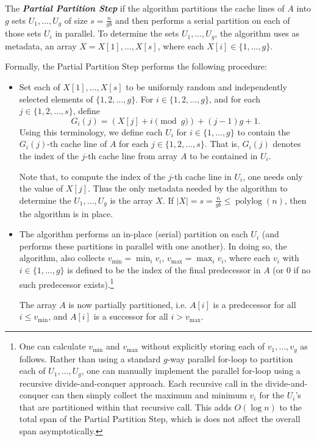 \documentclass[11pt]{article}
\newcommand{\defn}[1]{{\textit{\textbf{\boldmath #1}}} }
\theoremstyle{remark}
\theoremstyle{remark}
\begin{document}
The \defn{Partial Partition Step} if the algorithm partitions the
cache lines of $A$ into $g$ sets $U_1, \ldots, U_{g}$ of size $s =
\frac{n}{gb}$ and then performs a serial partition on each of those sets
$U_i$ in parallel. To determine the sets $U_1, \ldots, U_{g}$, the
algorithm uses as metadata, an array $X = X[1], \ldots, X[s]$,
where each $X[i] \in \{1, \ldots, g\}$.

Formally, the Partial Partition Step performs the following procedure:
\begin{itemize}
\item Set each of $X[1], \ldots, X[s]$ to be uniformly random and
  independently selected elements of $\{1, 2, \ldots, g\}$. For
  $i \in \{1, 2, \ldots, g\}$, and for each $j \in \{1, 2,
  \ldots, s\}$, define
  $$G_i(j) = (X[j] + i \pmod g) + (j - 1)g + 1.$$ Using this
  terminology, we define each $U_i$ for $i \in \{1, \ldots, g\}$ to
  contain the $G_i(j)$-th cache line of $A$ for each $j \in \{1, 2,
  \ldots, s\}$. That is, $G_i(j)$ denotes the index of the $j$-th
  cache line from array $A$ to be contained in $U_i$.

  Note that, to compute the index of the $j$-th cache line in $U_i$,
  one needs only the value of $X[j]$. Thus the only metadata needed by
  the algorithm to determine the $U_1, \ldots, U_g$ is the array
  $X$. If $|X| = s = \frac{n}{gb} \le \operatorname{polylog}(n)$, then
  the algorithm is in place.
  
\item The algorithm performs an in-place (serial) partition on each
  $U_i$ (and performs these partitions in parallel with one
  another). In doing so, the algorithm, also collects
  $v_{\text{min}}=\min_i{v_i}$, $v_{\text{max}}=\max_i{v_i}$, where
	each $v_i$ with $i \in \{1, \ldots, g\}$ is defined to be the index
  of the final predecessor in $A$ (or $0$ if no such predecessor
  exists).\footnote{One can calculate $v_{\text{min}}$ and
    $v_{\text{max}}$ without explicitly storing each of $v_1, \ldots,
		v_{g}$ as follows. Rather than using a standard $g$-way parallel
		for-loop to partition each of $U_1, \ldots, U_{g}$, one can
    manually implement the parallel for-loop using a recursive
    divide-and-conquer approach. Each recursive call in the
    divide-and-conquer can then simply collect the maximum and minimum
    $v_i$ for the $U_i$'s that are partitioned within that recursive
    call. This adds $O(\log n)$ to the total span of the Partial
    Partition Step, which is does not affect the overall span
    asymptotically. %
  }
  
  The array $A$ is now partially partitioned, i.e. $A[i]$ is a
  predecessor for all $i \le v_{\text{min}}$, and $A[i]$ is a successor
  for all $i > v_{\text{max}}$.
\end{itemize}
\end{document}
